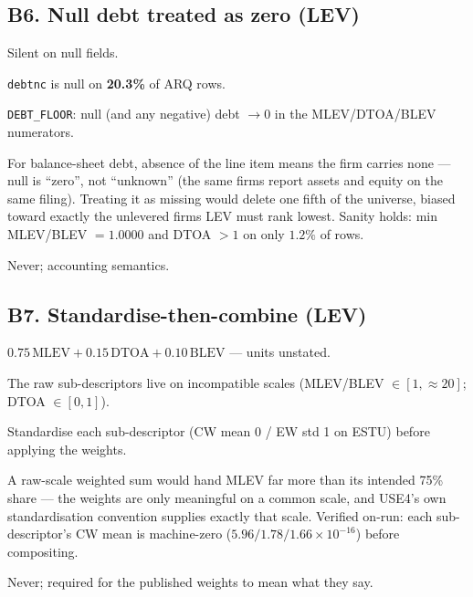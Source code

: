 \documentclass[11pt,a4paper]{article}
\begin{document}
\subsection{B6. Null debt treated as zero (LEV)}

\begin{description}[style=nextline]
  \item[USE4] Silent on null fields.
  \item[Deviation] \texttt{debtnc} is null on \textbf{20.3\%} of ARQ rows.
  \item[Solution] \texttt{DEBT\_FLOOR}: null (and any negative) debt $\to 0$ in
    the MLEV/DTOA/BLEV numerators.
  \item[Validity] For balance-sheet debt, absence of the line item means the
    firm carries none --- null is ``zero'', not ``unknown'' (the same firms
    report assets and equity on the same filing). Treating it as missing would
    delete one fifth of the universe, biased toward exactly the unlevered
    firms LEV must rank lowest. Sanity holds: min MLEV/BLEV $=1.0000$ and
    DTOA $>1$ on only $1.2\%$ of rows.
  \item[Revisit when] Never; accounting semantics.
\end{description}

\subsection{B7. Standardise-then-combine (LEV)}

\begin{description}[style=nextline]
  \item[USE4] $0.75\,\mathrm{MLEV} + 0.15\,\mathrm{DTOA} + 0.10\,\mathrm{BLEV}$
    --- units unstated.
  \item[Deviation] The raw sub-descriptors live on incompatible scales
    (MLEV/BLEV $\in [1, \approx 20]$; DTOA $\in [0, 1]$).
  \item[Solution] Standardise each sub-descriptor (CW mean 0 / EW std 1 on
    ESTU) before applying the weights.
  \item[Validity] A raw-scale weighted sum would hand MLEV far more than its
    intended 75\% share --- the weights are only meaningful on a common scale,
    and USE4's own standardisation convention supplies exactly that scale.
    Verified on-run: each sub-descriptor's CW mean is machine-zero
    ($5.96/1.78/1.66 \times 10^{-16}$) before compositing.
  \item[Revisit when] Never; required for the published weights to mean what
    they say.
\end{description}
\end{document}
